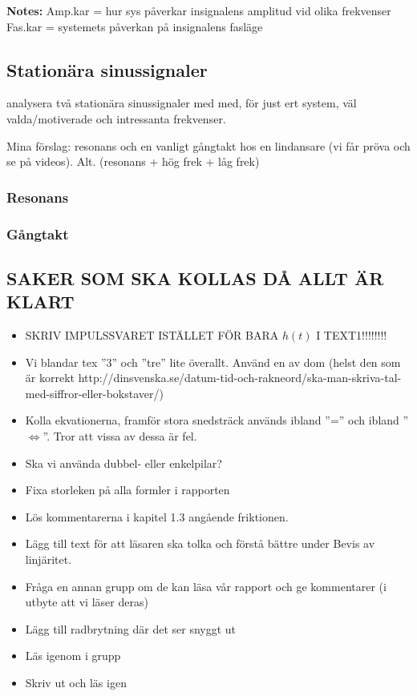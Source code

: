 \textbf{Notes:}
Amp.kar = hur sys påverkar insignalens amplitud vid olika frekvenser
Fas.kar  = systemets påverkan på insignalens fasläge

\subsection{Stationära sinussignaler}
analysera två stationära sinussignaler med med, för just ert system, väl valda/motiverade och intressanta frekvenser.

Mina förslag: resonans och en vanligt gångtakt hos en lindansare (vi får pröva och se på videos). Alt. (resonans + hög frek + låg frek)

\subsubsection{Resonans}
\subsubsection{Gångtakt}

\subsection{SAKER SOM SKA KOLLAS DÅ ALLT ÄR KLART}
\begin{itemize}
    \item SKRIV IMPULSSVARET ISTÄLLET FÖR BARA $h(t)$ I TEXT1!!!!!!!!
    \item Vi blandar tex ''3'' och ''tre'' lite överallt. Använd en av dom (helst den som är korrekt http://dinsvenska.se/datum-tid-och-rakneord/ska-man-skriva-tal-med-siffror-eller-bokstaver/)
    \item Kolla ekvationerna, framför stora snedsträck används ibland ''='' och ibland ''$\Longleftrightarrow$''. Tror att vissa av dessa är fel.
    \item Ska vi använda dubbel- eller enkelpilar? 
    \item Fixa storleken på alla formler i rapporten
    \item Lös kommentarerna i kapitel 1.3 angående friktionen.
    \item Lägg till text för att läsaren ska tolka och förstå bättre under Bevis av linjäritet.
    \item Fråga en annan grupp om de kan läsa vår rapport och ge kommentarer (i utbyte att vi läser deras)
    \item Lägg till radbrytning där det ser snyggt ut
    \item Läs igenom i grupp
    \item Skriv ut och läs igen
\end{itemize}